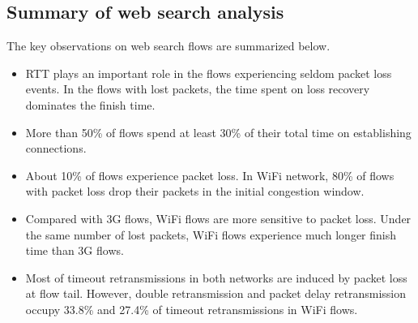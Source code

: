 \subsection{Summary of web search analysis}

The key observations on web search flows are summarized below.

\begin{itemize}
	\item RTT plays an important role in the flows experiencing seldom packet loss events. In the flows with lost packets, the time spent on loss recovery dominates the finish time.
	\item More than 50\% of flows spend at least 30\% of their total time on establishing connections.
	\item About 10\% of flows experience packet loss. In WiFi network, 80\% of flows with packet loss drop their packets in the initial congestion window.
	\item Compared with 3G flows, WiFi flows are more sensitive to packet loss. Under the same number of lost packets, WiFi flows experience much longer finish time than 3G flows.
	\item Most of timeout retransmissions in both networks are induced by packet loss at flow tail. However, double retransmission and packet delay retransmission occupy 33.8\% and 27.4\% of timeout retransmissions in WiFi flows.
\end{itemize}